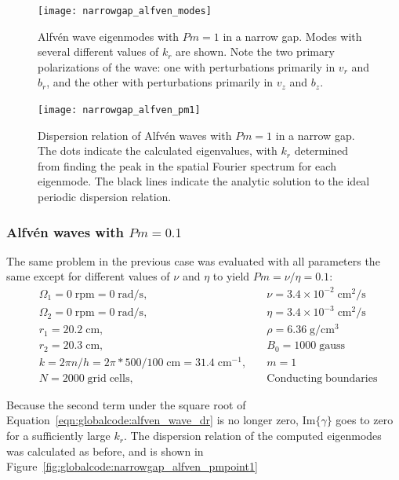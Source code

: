 \documentclass[letterpaper]{article}
\begin{document}
\begin{figure}
\centering
\texttt{[image: narrowgap\_alfven\_modes]}
\caption[Alfv\'en wave eigenmodes with $Pm=1$ in a narrow
  gap]{Alfv\'en wave eigenmodes with $Pm=1$ in a narrow gap. Modes
  with several different values of $k_r$ are shown. Note the two
  primary polarizations of the wave: one with perturbations primarily
  in $v_r$ and $b_r$, and the other with perturbations primarily in
  $v_z$ and $b_z$.}
\label{fig:globalcode:narrowgap_alfven_modes}
\end{figure}

\begin{figure}
\centering
\texttt{[image: narrowgap\_alfven\_pm1]}
\caption[Dispersion relation of Alfv\'en waves with $Pm=1$ in a narrow
  gap]{Dispersion relation of Alfv\'en waves with $Pm=1$ in a narrow
  gap. The dots indicate the calculated eigenvalues, with $k_r$
  determined from finding the peak in the spatial Fourier spectrum for
  each eigenmode. The black lines indicate the analytic solution to
  the ideal periodic dispersion relation.}
\label{fig:globalcode:narrowgap_alfven_pm1}
\end{figure}


\subsubsection{Alfv\'en waves with $Pm=0.1$}

The same problem in the previous case was evaluated with all parameters the same except for different values of $\nu$ and $\eta$ to yield $Pm = \nu/\eta = 0.1$:
\begin{align*}
&\Omega_1 = 0\;\mathrm{rpm} = 0\;\mathrm{rad/s},\quad
    &\nu = 3.4\times10^{-2}\;\mathrm{cm^2/s}
\\
&\Omega_2 = 0\;\mathrm{rpm} = 0\;\mathrm{rad/s},\quad
    &\eta = 3.4\times10^{-3}\;\mathrm{cm^2/s}
\\
&r_1 = 20.2\;\mathrm{cm},\quad &\rho = 6.36\;\mathrm{g/cm^3}
\\
&r_2 = 20.3\;\mathrm{cm},\quad &B_0 = 1000\; \mathrm{gauss}
\\
&k = 2\pi n/h = 2\pi*500/100\;\mathrm{cm} = 31.4\;\mathrm{cm^{-1}},\quad
    &m=1
\\
&N = 2000\;\mathrm{grid\;cells},\quad &\mathrm{Conducting\;boundaries}
\end{align*}

Because the second term under the square root of
Equation~\ref{eqn:globalcode:alfven_wave_dr} is no longer zero, $\mathrm{Im}\{\gamma\}$ goes to zero for a sufficiently large $k_r$. The dispersion relation of the computed eigenmodes was calculated as before, and is shown in Figure~\ref{fig:globalcode:narrowgap_alfven_pmpoint1}
\end{document}
